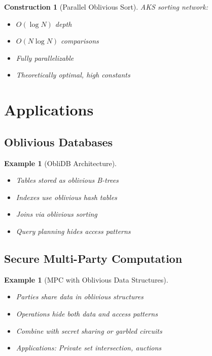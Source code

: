 \documentclass[11pt,final]{article}
\newtheorem{example}[theorem]{Example}
\newtheorem{construction}[theorem]{Construction}
\begin{document}
\begin{construction}[Parallel Oblivious Sort]
AKS sorting network:
\begin{itemize}
    \item $O(\log N)$ depth
    \item $O(N \log N)$ comparisons
    \item Fully parallelizable
    \item Theoretically optimal, high constants
\end{itemize}
\end{construction}

\section{Applications}

\subsection{Oblivious Databases}

\begin{example}[ObliDB Architecture]
\begin{itemize}
    \item Tables stored as oblivious B-trees
    \item Indexes use oblivious hash tables
    \item Joins via oblivious sorting
    \item Query planning hides access patterns
\end{itemize}
\end{example}

\subsection{Secure Multi-Party Computation}

\begin{example}[MPC with Oblivious Data Structures]
\begin{itemize}
    \item Parties share data in oblivious structures
    \item Operations hide both data and access patterns
    \item Combine with secret sharing or garbled circuits
    \item Applications: Private set intersection, auctions
\end{itemize}
\end{example}
\end{document}

